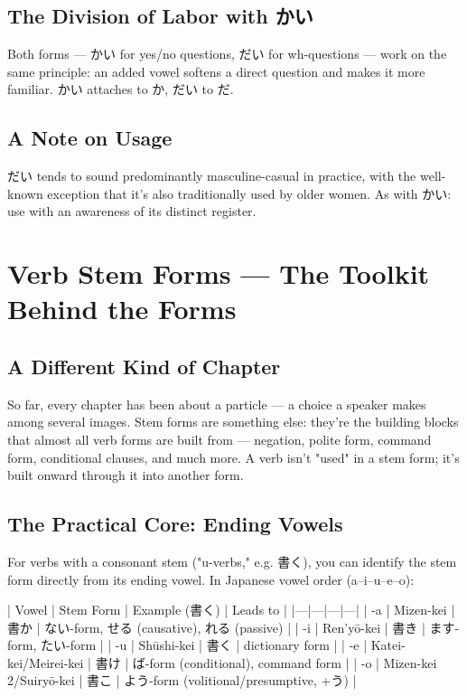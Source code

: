 \documentclass[12pt]{book}
\begin{document}
\section*{The Division of Labor with かい}

Both forms — かい for yes/no questions, だい for wh-questions — work on the same principle: an added vowel softens a direct question and makes it more familiar. かい attaches to か, だい to だ.

\section*{A Note on Usage}

だい tends to sound predominantly masculine-casual in practice, with the well-known exception that it's also traditionally used by older women. As with かい: use with an awareness of its distinct register.


\chapter{Verb Stem Forms — The Toolkit Behind the Forms}

\section*{A Different Kind of Chapter}

So far, every chapter has been about a particle — a choice a speaker makes among several images. Stem forms are something else: they're the building blocks that almost all verb forms are built from — negation, polite form, command form, conditional clauses, and much more. A verb isn't "used" in a stem form; it's built onward through it into another form.

\section*{The Practical Core: Ending Vowels}

For verbs with a consonant stem ("u-verbs," e.g. 書く), you can identify the stem form directly from its ending vowel. In Japanese vowel order (a–i–u–e–o):

| Vowel | Stem Form | Example (書く) | Leads to |
|---|---|---|---|
| -a | Mizen-kei | 書か | ない-form, せる (causative), れる (passive) |
| -i | Ren'yō-kei | 書き | ます-form, たい-form |
| -u | Shūshi-kei | 書く | dictionary form |
| -e | Katei-kei/Meirei-kei | 書け | ば-form (conditional), command form |
| -o | Mizen-kei 2/Suiryō-kei | 書こ | よう-form (volitional/presumptive, +う) |
\end{document}
